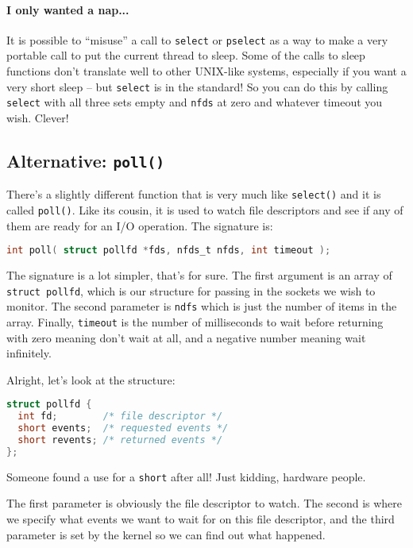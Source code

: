 \paragraph{I only wanted a nap...} It is possible to ``misuse'' a call to \texttt{select} or \texttt{pselect} as a way to make a very portable call to put the current thread to sleep. Some of the calls to sleep functions don't translate well to other UNIX-like systems, especially if you want a very short sleep -- but \texttt{select} is in the standard! So you can do this by calling \texttt{select} with all three sets empty and \texttt{nfds} at zero and whatever timeout you wish. Clever!

\subsection*{Alternative: \texttt{poll()}}
There's a slightly different function that is very much like \texttt{select()} and it is called \texttt{poll()}. Like its cousin, it is used to watch file descriptors and see if any of them are ready for an I/O operation. The signature is:

\begin{lstlisting}[language=C]
int poll( struct pollfd *fds, nfds_t nfds, int timeout );
\end{lstlisting}

The signature is a lot simpler, that's for sure. The first argument is an array of \texttt{struct pollfd}, which is our structure for passing in the sockets we wish to monitor. The second parameter is \texttt{ndfs} which is just the number of items in the array. Finally, \texttt{timeout} is the number of milliseconds to wait before returning with zero meaning don't wait at all, and a negative number meaning wait infinitely.

Alright, let's look at the structure:

\begin{lstlisting}[language=C]
struct pollfd {
  int fd;        /* file descriptor */
  short events;  /* requested events */
  short revents; /* returned events */
};
\end{lstlisting}

Someone found a use for a \texttt{short} after all! Just kidding, hardware people.

The first parameter is obviously the file descriptor to watch. The second is where we specify what events we want to wait for on this file descriptor, and the third parameter is set by the kernel so we can find out what happened.

